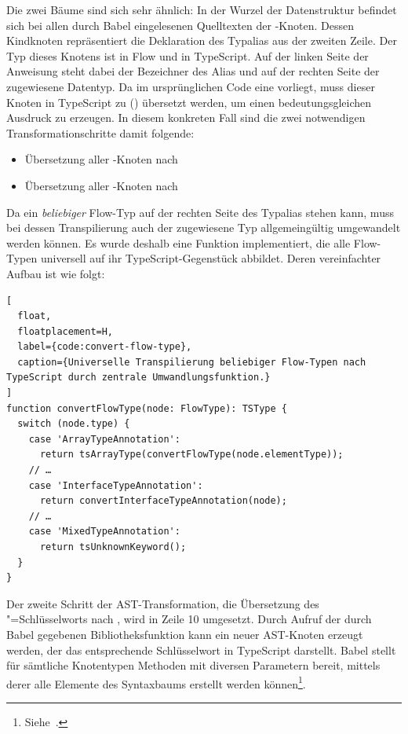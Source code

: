 {Die zwei Bäume sind sich sehr ähnlich: In der Wurzel der Datenstruktur befindet sich bei allen durch Babel eingelesenen Quelltexten der -Knoten. Dessen Kindknoten repräsentiert die Deklaration des Typalias aus der zweiten Zeile. Der Typ dieses Knotens ist  in Flow und  in TypeScript. Auf der linken Seite der Anweisung steht dabei der Bezeichner des Alias und auf der rechten Seite der zugewiesene Datentyp. Da im ursprünglichen Code eine  vorliegt, muss dieser Knoten in TypeScript zu  () übersetzt werden, um einen bedeutungsgleichen Ausdruck zu erzeugen. In diesem konkreten Fall sind die zwei notwendigen Transformationschritte damit folgende:

\begin{itemize}
  \item Übersetzung aller -Knoten nach 
  \item Übersetzung aller -Knoten nach 
\end{itemize}

Da ein \emph{beliebiger} Flow-Typ auf der rechten Seite des Typalias stehen kann, muss bei dessen Transpilierung auch der zugewiesene Typ allgemeingültig umgewandelt werden können. Es wurde deshalb eine Funktion implementiert, die alle Flow-Typen universell auf ihr TypeScript-Gegenstück abbildet. Deren vereinfachter Aufbau ist wie folgt:

\begin{lstlisting}[
  float,
  floatplacement=H,
  label={code:convert-flow-type},
  caption={Universelle Transpilierung beliebiger Flow-Typen nach TypeScript durch zentrale Umwandlungsfunktion.}
]
function convertFlowType(node: FlowType): TSType {
  switch (node.type) {
    case 'ArrayTypeAnnotation':
      return tsArrayType(convertFlowType(node.elementType));
    // …
    case 'InterfaceTypeAnnotation':
      return convertInterfaceTypeAnnotation(node);
    // …
    case 'MixedTypeAnnotation':
      return tsUnknownKeyword();
  }
}
\end{lstlisting}

Der zweite Schritt der AST-Transformation, die Übersetzung des "=Schlüsselworts nach , wird in Zeile 10 umgesetzt. Durch Aufruf der durch Babel gegebenen Bibliotheksfunktion  kann ein neuer AST-Knoten erzeugt werden, der das entsprechende Schlüsselwort in TypeScript darstellt. Babel stellt für sämtliche Knotentypen Methoden mit diversen Parametern bereit, mittels derer alle Elemente des Syntaxbaums erstellt werden können\footnote{Siehe~\autocite{BABEL:TYPES}.}.

}
